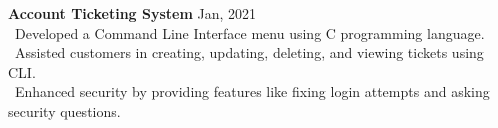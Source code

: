 {\textbf{Account Ticketing System} \hfill {Jan, 2021} \\
\hspace*{4pt} \textbullet~{Developed a Command Line Interface menu using C programming language.} \\
\hspace*{4pt} \textbullet~{Assisted customers in creating, updating, deleting, and viewing tickets using CLI.} \\
\hspace*{4pt} \textbullet~{Enhanced security by providing features like fixing login attempts and asking security questions.}} \\
